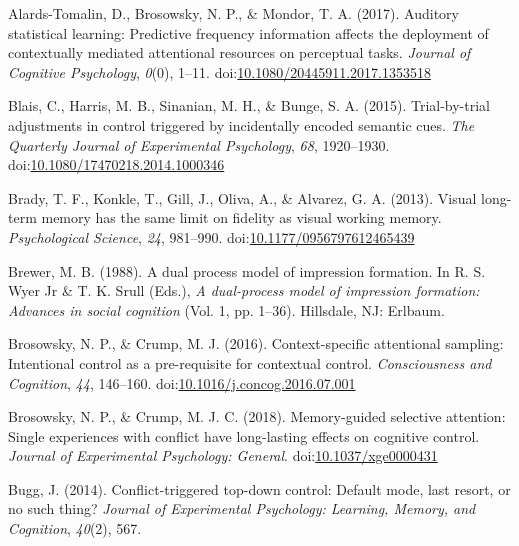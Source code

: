\documentclass[english,,man,floatsintext]{apa6}
\begin{document}
\leavevmode\hypertarget{ref-alards-tomalin_auditory_2017}{}%
Alards-Tomalin, D., Brosowsky, N. P., \& Mondor, T. A. (2017). Auditory statistical learning: Predictive frequency information affects the deployment of contextually mediated attentional resources on perceptual tasks. \emph{Journal of Cognitive Psychology}, \emph{0}(0), 1--11. doi:\href{https://doi.org/10.1080/20445911.2017.1353518}{10.1080/20445911.2017.1353518}

\leavevmode\hypertarget{ref-blais_trial-by-trial_2015}{}%
Blais, C., Harris, M. B., Sinanian, M. H., \& Bunge, S. A. (2015). Trial-by-trial adjustments in control triggered by incidentally encoded semantic cues. \emph{The Quarterly Journal of Experimental Psychology}, \emph{68}, 1920--1930. doi:\href{https://doi.org/10.1080/17470218.2014.1000346}{10.1080/17470218.2014.1000346}

\leavevmode\hypertarget{ref-brady_visual_2013}{}%
Brady, T. F., Konkle, T., Gill, J., Oliva, A., \& Alvarez, G. A. (2013). Visual long-term memory has the same limit on fidelity as visual working memory. \emph{Psychological Science}, \emph{24}, 981--990. doi:\href{https://doi.org/10.1177/0956797612465439}{10.1177/0956797612465439}

\leavevmode\hypertarget{ref-brewer_dual_1988}{}%
Brewer, M. B. (1988). A dual process model of impression formation. In R. S. Wyer Jr \& T. K. Srull (Eds.), \emph{A dual-process model of impression formation: Advances in social cognition} (Vol. 1, pp. 1--36). Hillsdale, NJ: Erlbaum.

\leavevmode\hypertarget{ref-brosowsky_context-specific_2016}{}%
Brosowsky, N. P., \& Crump, M. J. (2016). Context-specific attentional sampling: Intentional control as a pre-requisite for contextual control. \emph{Consciousness and Cognition}, \emph{44}, 146--160. doi:\href{https://doi.org/10.1016/j.concog.2016.07.001}{10.1016/j.concog.2016.07.001}

\leavevmode\hypertarget{ref-brosowsky_memory-guided_2018}{}%
Brosowsky, N. P., \& Crump, M. J. C. (2018). Memory-guided selective attention: Single experiences with conflict have long-lasting effects on cognitive control. \emph{Journal of Experimental Psychology: General}. doi:\href{https://doi.org/10.1037/xge0000431}{10.1037/xge0000431}

\leavevmode\hypertarget{ref-bugg_conflict-triggered_2014}{}%
Bugg, J. (2014). Conflict-triggered top-down control: Default mode, last resort, or no such thing? \emph{Journal of Experimental Psychology: Learning, Memory, and Cognition}, \emph{40}(2), 567.
\end{document}

